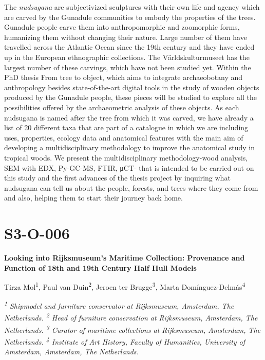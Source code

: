 \documentclass[
]{book}
\begin{document}
The \emph{nudsugana} are subjectivized sculptures with their own life and agency which are carved by the Gunadule communities to embody the properties of the trees. Gunadule people carve them into anthropomorphic and zoomorphic forms, humanizing them without changing their nature. Large number of them have travelled across the Atlantic Ocean since the 19th century and they have ended up in the European ethnographic collections. The Världskulturmuseet has the largest number of these carvings, which have not been studied yet. Within the PhD thesis From tree to object, which aims to integrate archaeobotany and anthropology besides state-of-the-art digital tools in the study of wooden objects produced by the Gunadule people, these pieces will be studied to explore all the possibilities offered by the archaeometric analysis of these objects. As each nudsugana is named after the tree from which it was carved, we have already a list of 20 different taxa that are part of a catalogue in which we are including uses, properties, ecology data and anatomical features with the main aim of developing a multidisciplinary methodology to improve the anatomical study in tropical woods. We present the multidisciplinary methodology-wood analysis, SEM with EDX, Py-GC-MS, FTIR, μCT- that is intended to be carried out on this study and the first advances of the thesis project by inquiring what nudsugana can tell us about the people, forests, and trees where they come from and also, helping them to start their journey back home.

\hypertarget{s3-o-006}{%
\section*{S3-O-006}\label{s3-o-006}}

\textbf{Looking into Rijksmuseum's Maritime Collection: Provenance and Function of 18th and 19th Century Half Hull Models}

Tirza Mol\textsuperscript{1}, Paul van Duin\textsuperscript{2}, Jeroen ter Brugge\textsuperscript{3}, Marta Domínguez-Delmás\textsuperscript{4}

\emph{\textsuperscript{1} Shipmodel and furniture conservator at Rijksmuseum, Amsterdam, The Netherlands. \textsuperscript{2} Head of furniture conservation at Rijksmuseum, Amsterdam, The Netherlands. \textsuperscript{3} Curator of maritime collections at Rijksmuseum, Amsterdam, The Netherlands. \textsuperscript{4} Institute of Art History, Faculty of Humanities, University of Amsterdam, Amsterdam, The Netherlands.}
\end{document}

